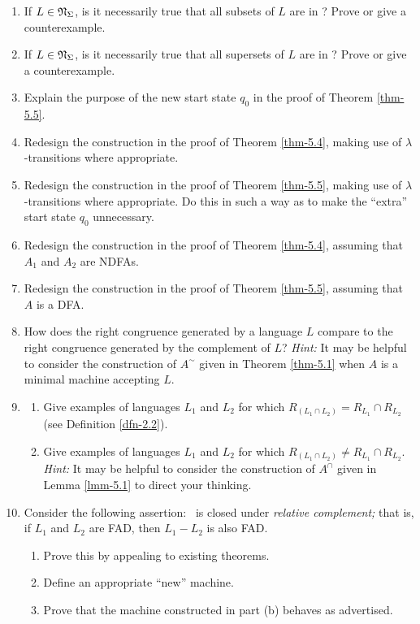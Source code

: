 \begin{enumerate}[{5.}1. ]
\item If $L \in \mathfrak{N}_\Sigma$, is it necessarily true that all subsets of $L$ are in
\NSIG? Prove or give a counterexample.

\item If $L \in \mathfrak{N}_\Sigma$, is it necessarily true that all supersets of $L$ are in
\NSIG? Prove or give a counterexample.

\item Explain the purpose of the new start state $q_0$ in the proof of Theorem
\ref{thm-5.5}.

\item Redesign the construction in the proof of Theorem \ref{thm-5.4}, making use of
$\lambda$-transitions where appropriate.

\item Redesign the construction in the proof of Theorem \ref{thm-5.5}, making use of
$\lambda$-transitions where appropriate. Do this in such a way as to make the
``extra'' start state $q_0$ unnecessary.

\item Redesign the construction in the proof of Theorem \ref{thm-5.4}, assuming that $A_1$
and $A_2$ are NDFAs.

\item Redesign the construction in the proof of Theorem \ref{thm-5.5}, assuming that $A$
is a DFA.

\item How does the right congruence generated by a language $L$ compare to the
right congruence generated by the complement of $L$? \emph{Hint:} It may be
helpful to consider the construction of $A^\sim$ given in Theorem \ref{thm-5.1} when $A$
is a minimal machine accepting $L$.

\item \begin{enumerate}
\item Give examples of languages $L_1$ and $L_2$ for which
$R_{(L_1 \cap L_2)} = R_{L_1} \cap R_{L_2}$ (see Definition \ref {dfn-2.2}).
\item Give examples of languages $L_1$ and $L_2$ for which
$R_{(L_1 \cap L_2)} \not= R_{L_1} \cap R_{L_2}$. \emph{Hint:} It may be helpful
to consider the construction of $A^\cap$ given in Lemma \ref{lmm-5.1} to direct your
thinking.
\end{enumerate}

\item Consider the following assertion: \DSIG\ is closed under \emph{relative
complement;} that is, if $L_1$ and $L_2$ are FAD, then $L_1 - L_2$ is also FAD.
\begin{enumerate}
\item Prove this by appealing to existing theorems.
\item Define an appropriate ``new'' machine.
\item Prove that the machine constructed in part (b) behaves as advertised.
\end{enumerate}


\end{enumerate}
